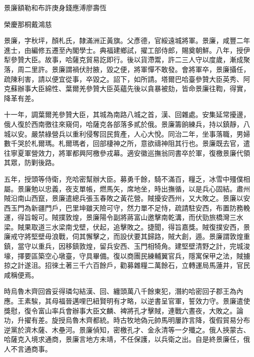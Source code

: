 
\begin{pinyinscope}
景廉額勒和布許庚身錢應溥廖壽恆

榮慶那桐戴鴻慈

景廉，字秋坪，顏札氏，隸滿洲正黃旗。父彥德，官綏遠城將軍。景廉，咸豐二年進士，由編修五遷至內閣學士。典福建鄉試，擢工部侍郎，賜奠朝鮮。八年，授伊犁參贊大臣。故事，哈薩克貿易訖即行。後以貨滯鬻，許二三人守以度歲，漸成聚落，周二里許。景廉謂禍伏肘腋，毀之便，將軍憚不敢發。會將軍卒，景廉攝任，疏陳利害，請以便宜從事，卒毀之。詔下，如所請。塔爾巴哈臺參贊大臣英秀、阿克蘇辦事大臣綿性、葉爾羌參贊大臣英蘊先後以貪暴被劾，皆命景廉往鞫，得實，降革有差。

十一年，調葉爾羌參贊大臣，其城為南路八城之首，漢、回雜處。安集延常擾邊，俄人復於西南徼往來窺伺，哈薩克各部落多貳於俄。景廉籌餉練兵，持以鎮靜，八城以安。嚴禁綠營兵以重利侵奪回民貲產，人心大悅。同治二年，坐事落職，男婦數千哭於札爾瑪。札爾瑪者，回部棲神之所，意欲禱神阻其行也。景廉既去官，遣往寧夏軍營效力，將軍都興阿檄參戎幕。適安徽巡撫翁同書卒於軍，復檄景廉代領其眾，防剿後路。

五年，授頭等侍衛，充哈密幫辦大臣。募勇千餘，騎不滿百，糧乏，冰雪中殭僕相屬。景廉勉以忠義，夜支單帳，燃馬矢，席地坐，時出撫循，以是兵心固結。肅州賊沿南山西竄，景廉遣總兵張玉春敗之黃花營。賊擾安西州，又大敗之。景廉以安西玉門為新疆門戶，巴里坤雖天險可守，然力單不足恃，疏請駐安西，布置防務輓運，得旨報可。賊撲敦煌，景廉陽令副將蔣富山邀擊南乾溝，而伏勁旅橋灣三水梁。賊果取道三水梁南戈壁，伏起，追擊敗之。捷聞，得旨嘉獎。賊復撲安西，景廉戒守將堅壁毋浪戰，伺其懈擊之，而設伏要其歸路，賊大創，遁。景廉謂敦煌重鎮，當守以重兵，因移鎮敦煌，留兵安西、玉門相犄角。建堅壁清野之計，完城浚壕，擇要區築空心墩臺，守具畢備。復以商團民練輔翼官兵，隱寓保甲之法，賊擄掠之計遂沮。招徠土著三千六百餘戶，勸募雜糧二萬餘石，立轉運局馬蓮井，官民咸稱便焉。

時烏魯木齊回酋妥得璘勾結漢、回、纏頭萬八千餘東犯，潛約哈密回子郡王為內應。王素騃，其母福晉邁哩巴紐賢明有才略，以逆書呈官軍，誓效力守。景廉遣使獎慰，復令富山率兵會辦事大臣文麟、裨將孔才擊賊，連戰六晝夜，大敗之。論功，升擢有差。旋授烏魯木齊都統。時古牧地偽元帥馬明屢詐言降，復假貿易分布逆黨於濟木薩、木壘河。景廉偵知，密檄孔才、金永清等一夕殲之。俄人挾蒙古、哈薩克入境求通商，景廉言地方未靖，不任保護，以兵衛之出。自是終景廉任，俄人不言通商事。


\end{pinyinscope}
